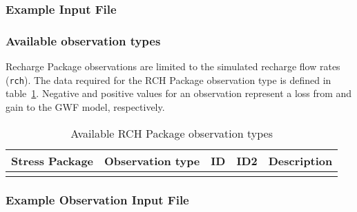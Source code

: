 \vspace{5mm}
\subsubsection{Example Input File}


\vspace{5mm}
\subsubsection{Available observation types}
Recharge Package observations are limited to the simulated recharge flow rates (\texttt{rch}). The data required for the RCH Package observation type is defined in table~\ref{table:gwf-rchobstype}. Negative and positive values for an observation represent a loss from and gain to the GWF model, respectively.

\begin{longtable}{p{2cm} p{2.75cm} p{2cm} p{1.25cm} p{7cm}}
\caption{Available RCH Package observation types} \tabularnewline

\hline
\hline
\textbf{Stress Package} & \textbf{Observation type} & \textbf{ID} & \textbf{ID2} & \textbf{Description} \\
\hline
\endhead

\hline
\endfoot


\label{table:gwf-rchobstype}
\end{longtable}

\vspace{5mm}
\subsubsection{Example Observation Input File}

